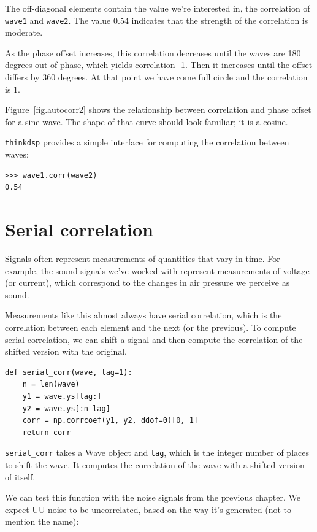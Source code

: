 \documentclass[12pt]{book}
\begin{document}
The off-diagonal elements contain the value we're interested in,
the correlation of {\tt wave1} and {\tt wave2}.  The value 0.54
indicates that the strength of the correlation is moderate.

As the phase offset increases, this correlation decreases until
the waves are 180 degrees out of phase, which yields correlation
-1.  Then it increases until the offset differs by 360 degrees.
At that point we have come full circle and the correlation is 1.

Figure~\ref{fig.autocorr2} shows the relationship between correlation and
phase offset for a sine wave.  The shape of that curve should look
familiar; it is a cosine.

{\tt thinkdsp} provides a simple interface for computing the
correlation between waves:

\begin{verbatim}
>>> wave1.corr(wave2)
0.54
\end{verbatim}


\section{Serial correlation}

Signals often represent measurements of quantities that vary in
time.  For example, the sound signals we've worked with represent
measurements of voltage (or current), which correspond to the changes
in air pressure we perceive as sound.

Measurements like this almost always have serial correlation, which
is the correlation between each element and the next (or the previous).
To compute serial correlation, we can shift a signal and then compute
the correlation of the shifted version with the original.

\begin{verbatim}
def serial_corr(wave, lag=1):
    n = len(wave)
    y1 = wave.ys[lag:]
    y2 = wave.ys[:n-lag]
    corr = np.corrcoef(y1, y2, ddof=0)[0, 1]
    return corr
\end{verbatim}

\verb"serial_corr" takes a Wave object and
{\tt lag}, which is the integer number of places to shift the wave.
It computes the correlation of the wave with a shifted version
of itself.

We can test this function with the noise signals from the previous
chapter.  We expect UU noise to be uncorrelated, based on the
way it's generated (not to mention the name):
\end{document}
